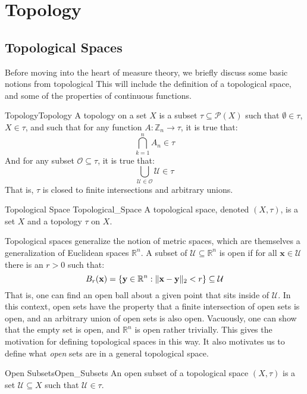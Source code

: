 \chapter{Topology}
    \section{Topological Spaces}
        Before moving into the heart of measure theory,
        we briefly discuss some basic notions from topological
        This will include the definition of a topological
        space, and some of the properties of continuous
        functions.
        \begin{ldefinition}{Topology}{Topology}
            A topology on a set $X$ is a subset
            $\tau\subseteq\mathcal{P}(X)$ such that
            $\emptyset\in\tau$, $X\in\tau$, and such that
            for any function $A:\mathbb{Z}_{n}\rightarrow\tau$,
            it is true that:
            \begin{equation}
                \bigcap_{k=1}^{n}A_{n}\in\tau
            \end{equation}
            And for any subset $\mathcal{O}\subseteq\tau$,
            it is true that:
            \begin{equation}
                \bigcup_{\mathcal{U}\in\mathcal{O}}
                    \mathcal{U}\in\tau
            \end{equation}
            That is, $\tau$ is closed to finite intersections
            and arbitrary unions.
        \end{ldefinition}
        \begin{ldefinition}{Topological Space}
              {Topological_Space}
            A topological space, denoted $(X,\tau)$, is a
            set $X$ and a topology $\tau$ on $X$.
        \end{ldefinition}
        Topological spaces generalize the notion of metric
        spaces, which are themselves a generalization of
        Euclidean spaces $\mathbb{R}^{n}$. A subset of
        $\mathcal{U}\subseteq\mathbb{R}^{n}$ is open if
        for all $\mathbf{x}\in\mathcal{U}$ there is an $r>0$
        such that:
        \begin{equation}
            B_{r}(\mathbf{x})=
            \{\mathbf{y}\in\mathbb{R}^{n}:
                \lVert\mathbf{x}-\mathbf{y}\rVert_{2}<r\}
            \subseteq\mathcal{U}
        \end{equation}
        That is, one can find an open ball about a given point
        that sits inside of $\mathcal{U}$. In this context, open
        sets have the property that a finite intersection of
        open sets is open, and an arbitrary union of open sets is
        also open. Vacuously, one can show that the empty set is
        open, and $\mathbb{R}^{n}$ is open rather trivially.
        This gives the motivation for defining topological spaces
        in this way. It also motivates us to define what
        \textit{open} sets are in a general topological space.
        \begin{ldefinition}{Open Subsets}{Open_Subsets}
            An open subset of a topological space $(X,\tau)$
            is a set $\mathcal{U}\subseteq{X}$ such that
            $\mathcal{U}\in\tau$.
        \end{ldefinition}

